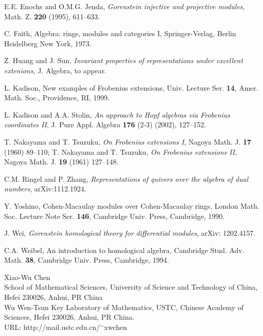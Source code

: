 \documentclass[a4paper]{amsart}
\theoremstyle{definition}
\theoremstyle{remark}
\numberwithin{equation}{section}
\begin{document}
\begin{thebibliography}{9999}
 {\sc E.E. Enochs and O.M.G. Jenda,} {\em Gorenstein injective and projective
modules, } Math. Z. {\bf 220} (1995), 611--633.

 {\sc C. Faith,} Algebra: rings, modules and categories I, Springer-Verlag, Berlin
Heidelberg New York, 1973.

 {\sc Z. Huang and J. Sun}, {\em Invariant properties of representations under excellent extenions,}
J. Algebra, to appear.

 {\sc L. Kadison,}  New examples of Frobenius extensions, Univ. Lecture Ser. {\bf  14}, Amer. Math. Soc.,
    Providence, RI, 1999.

 {\sc L. Kadison and A.A. Stolin}, {\em An approach to Hopf algebras via Frobenius coordinates II},
J. Pure Appl. Algebra {\bf 176} (2-3) (2002), 127--152.

 {\sc T. Nakayama and  T. Tsuzuku}, {\em On Frobenius extensions I}, Nagoya Math. J. {\bf 17} (1960) 89--110; {\sc T. Nakayama and T. Tsuzuku}, {\em On Frobenius extensions II}, Nagoya Math. J. {\bf 19} (1961) 127--148.

 {\sc C.M. Ringel and P. Zhang}, {\em Representations of quivers over the algebra of dual numbers},
arXiv:1112.1924.

 {\sc Y. Yoshino,} Cohen-Macaulay modules over Cohen-Macaulay rings, London Math. Soc. Lecture
Note Ser. {\bf 146}, Cambridge Univ. Press, Cambridge, 1990.

 {\sc J. Wei}, {\em Gorenstein homological theory for differential modules}, arXiv: 1202.4157.

 {\sc C.A. Weibel}, An introduction to homological algebra, Cambridge Stud. Adv. Math. {\bf 38}, Cambridge Univ. Press, Cambridge, 1994.

\end{thebibliography}

\vskip 10pt

 {\footnotesize \noindent Xiao-Wu Chen\\
  School of Mathematical Sciences, University of Science and Technology of
China, Hefei 230026, Anhui, PR China \\
Wu Wen-Tsun Key Laboratory of Mathematics, USTC, Chinese Academy of Sciences, Hefei 230026, Anhui, PR China.\\
URL: http://mail.ustc.edu.cn/$^\sim$xwchen}
\end{document}
